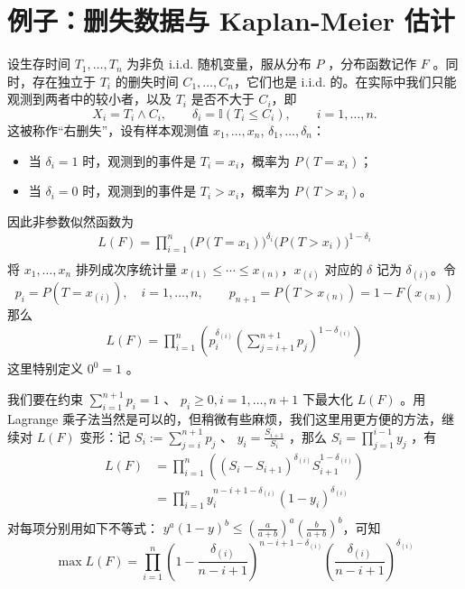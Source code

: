 \section{例子：删失数据与 Kaplan-Meier 估计}

设生存时间 $T_1, \ldots, T_n$ 为非负 i.i.d. 随机变量，服从分布 $P$ ，分布函数记作 $F$ 。同时，存在独立于 $T_i$ 的删失时间 $C_1, \ldots, C_n$，它们也是 i.i.d. 的。在实际中我们只能观测到两者中的较小者，以及 $T_i$ 是否不大于 $C_i$，即
\[X_i =  T_i\wedge C_i,\qquad \delta_i = \mathbb I(T_i\le C_i),\qquad i=1,\ldots,n.\]
这被称作``右删失''，设有样本观测值 $x_1,\ldots,x_n$, $\delta_1,\ldots,\delta_n$：

\begin{itemize}
\tightlist
\item
  当 $\delta_i = 1$ 时，观测到的事件是 $T_i = x_i$，概率为 $P(T=x_i)$；
\item
  当 $\delta_i = 0$ 时，观测到的事件是 $T_i > x_i$，概率为 $P(T>x_i)$。
\end{itemize}

因此非参数似然函数为
\[\begin{aligned} L(F) = \prod_{i=1}^{n} \bigl( P(T=x_1) \bigr)^{\delta_i} \bigl( P(T>x_i) \bigr)^{1-\delta_i}\\  \end{aligned}\]
将 $x_1, \ldots, x_n$ 排列成次序统计量 $x_{(1)} \le \cdots \le x_{(n)}$，$x_{(i)}$ 对应的 $\delta$ 记为 $\delta_{(i)}$。令
\[p_i = P(T=x_{(i)}),\quad i=1,\ldots,n,\qquad p_{n+1} = P(T > x_{(n)}) = 1 - F(x_{(n)})\]
那么
\[\begin{aligned} L(F) = \prod_{i=1}^{n} \left( p_i^{\delta_{(i)}} \left( \sum_{j=i+1}^{n+1} p_j \right)^{1-\delta_{(i)}} \right) \end{aligned}\]
这里特别定义 $0^0=1$ 。

我们要在约束 $\sum_{i=1}^{n+1} p_i = 1$ 、 $p_i\ge 0,i=1,\dots,n+1$ 下最大化 $L(F)$ 。用 Lagrange 乘子法当然是可以的，但稍微有些麻烦，我们这里用更方便的方法，继续对 $L(F)$ 变形：记 $S_i := \sum_{j=i}^{n+1} p_j$ 、 $y_{i} = \frac{S_{i+1}}{S_i}$ ，那么 $S_i=\prod_{j=1}^{i-1}y_j$ ，有
\[\begin{aligned}   L(F)&=\prod_{i=1}^{n} \left( (S_{i} - S_{i+1})^{\delta_{(i)}} S_{i+1}^{1-\delta_{(i)}} \right)\\   &=   \prod_{i=1}^{n} y_i^{n-i+1-\delta_{(i)}} (1-y_i)^{\delta_{(i)}}\\    \end{aligned}\]
对每项分别用如下不等式： $y^a (1-y)^b \le \left( \frac{a}{a+b} \right)^a \left( \frac{b}{a+b} \right)^b$，可知 
$$\max L(F)= \prod_{i=1}^{n} \left( 1-\frac{\delta_{(i)}}{n-i+1} \right)^{n-i+1-\delta_{(i)}} \left( \frac{\delta_{(i)}}{n-i+1} \right)^{\delta_{(i)}}$$

